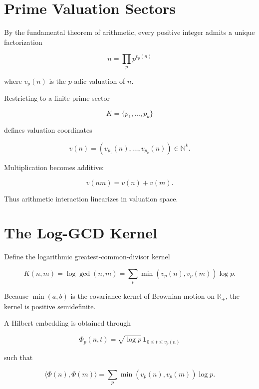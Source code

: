 \documentclass[11pt]{article}
\begin{document}
\section{Prime Valuation Sectors}

By the fundamental theorem of arithmetic, every positive integer admits a unique factorization

\begin{equation}
n = \prod_p p^{v_p(n)}
\end{equation}

where $v_p(n)$ is the $p$-adic valuation of $n$.

Restricting to a finite prime sector

\begin{equation}
K = \{p_1,\dots,p_k\}
\end{equation}

defines valuation coordinates

\begin{equation}
v(n) = (v_{p_1}(n),\dots,v_{p_k}(n)) \in \mathbb{N}^k.
\end{equation}

Multiplication becomes additive:

\begin{equation}
v(nm)=v(n)+v(m).
\end{equation}

Thus arithmetic interaction linearizes in valuation space.

\section{The Log-GCD Kernel}

Define the logarithmic greatest-common-divisor kernel

\begin{equation}
K(n,m)
= \log \gcd(n,m)
= \sum_p \min(v_p(n),v_p(m))\log p.
\end{equation}

Because $\min(a,b)$ is the covariance kernel of Brownian motion on $\mathbb{R}_+$, the kernel is positive semidefinite.

A Hilbert embedding is obtained through

\begin{equation}
\Phi_p(n,t)
= \sqrt{\log p}\,
\mathbf{1}_{0\le t \le v_p(n)}
\end{equation}

such that

\begin{equation}
\langle \Phi(n),\Phi(m)\rangle
= \sum_p \min(v_p(n),v_p(m))\log p.
\end{equation}
\end{document}
